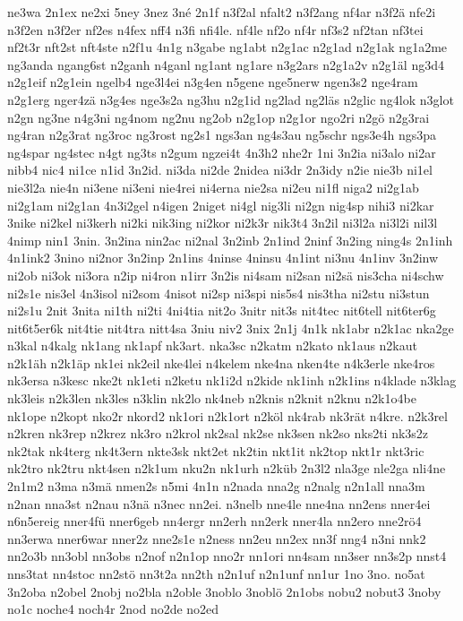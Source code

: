 {ne3wa
2n1ex
ne2xi
5ney
3nez
3né
2n1f
n3f2al
nfalt2
n3f2ang
nf4ar
n3f2ä
nfe2i
n3f2en
n3f2er
nf2es
n4fex
nff4
n3fi
nfi4le.
nf4le
nf2o
nf4r
nf3s2
nf2tan
nf3tei
nf2t3r
nft2st
nft4ste
n2f1u
4n1g
n3gabe
ng1abt
n2g1ac
n2g1ad
n2g1ak
ng1a2me
ng3anda
ngang6st
n2ganh
n4ganl
ng1ant
ng1are
n3g2ars
n2g1a2v
n2g1äl
ng3d4
n2g1eif
n2g1ein
ngelb4
nge3l4ei
n3g4en
n5gene
nge5nerw
ngen3s2
nge4ram
n2g1erg
nger4zä
n3g4es
nge3s2a
ng3hu
n2g1id
ng2lad
ng2läs
n2glic
ng4lok
n3glot
n2gn
ng3ne
n4g3ni
ng4nom
ng2nu
ng2ob
n2g1op
n2g1or
ngo2ri
n2gö
n2g3rai
ng4ran
n2g3rat
ng3roc
ng3rost
ng2s1
ngs3an
ng4s3au
ng5schr
ngs3e4h
ngs3pa
ng4spar
ng4stec
n4gt
ng3ts
n2gum
ngzei4t
4n3h2
nhe2r
1ni
3n2ia
ni3alo
ni2ar
nibb4
nic4
ni1ce
n1id
3n2id.
ni3da
ni2de
2nidea
ni3dr
2n3idy
n2ie
nie3b
ni1el
nie3l2a
nie4n
ni3ene
ni3eni
nie4rei
ni4erna
nie2sa
ni2eu
ni1fl
niga2
ni2g1ab
ni2g1am
ni2g1an
4n3i2gel
n4igen
2niget
ni4gl
nig3li
ni2gn
nig4sp
nihi3
ni2kar
3nike
ni2kel
ni3kerh
ni2ki
nik3ing
ni2kor
ni2k3r
nik3t4
3n2il
ni3l2a
ni3l2i
nil3l
4nimp
nin1
3nin.
3n2ina
nin2ac
ni2nal
3n2inb
2n1ind
2ninf
3n2ing
ning4s
2n1inh
4n1ink2
3nino
ni2nor
3n2inp
2n1ins
4ninse
4ninsu
4n1int
ni3nu
4n1inv
3n2inw
ni2ob
ni3ok
ni3ora
n2ip
ni4ron
n1irr
3n2is
ni4sam
ni2san
ni2sä
nis3cha
ni4schw
ni2s1e
nis3el
4n3isol
ni2som
4nisot
ni2sp
ni3spi
nis5s4
nis3tha
ni2stu
ni3stun
ni2s1u
2nit
3nita
ni1th
ni2ti
4ni4tia
nit2o
3nitr
nit3s
nit4tec
nit6tell
nit6ter6g
nit6t5er6k
nit4tie
nit4tra
nitt4sa
3niu
niv2
3nix
2n1j
4n1k
nk1abr
n2k1ac
nka2ge
n3kal
n4kalg
nk1ang
nk1apf
nk3art.
nka3sc
n2katm
n2kato
nk1aus
n2kaut
n2k1äh
n2k1äp
nk1ei
nk2eil
nke4lei
n4kelem
nke4na
nken4te
n4k3erle
nke4ros
nk3ersa
n3kesc
nke2t
nk1eti
n2ketu
nk1i2d
n2kide
nk1inh
n2k1ins
n4klade
n3klag
nk3leis
n2k3len
nk3les
n3klin
nk2lo
nk4neb
n2knis
n2knit
n2knu
n2k1o4be
nk1ope
n2kopt
nko2r
nkord2
nk1ori
n2k1ort
n2köl
nk4rab
nk3rät
n4kre.
n2k3rel
n2kren
nk3rep
n2krez
nk3ro
n2krol
nk2sal
nk2se
nk3sen
nk2so
nks2ti
nk3s2z
nk2tak
nk4terg
nk4t3ern
nkte3sk
nkt2et
nk2tin
nkt1it
nk2top
nkt1r
nkt3ric
nk2tro
nk2tru
nkt4sen
n2k1um
nku2n
nk1urh
n2küb
2n3l2
nla3ge
nle2ga
nli4ne
2n1m2
n3ma
n3mä
nmen2s
n5mi
4n1n
n2nada
nna2g
n2nalg
n2n1all
nna3m
n2nan
nna3st
n2nau
n3nä
n3nec
nn2ei.
n3nelb
nne4le
nne4na
nn2ens
nner4ei
n6n5ereig
nner4fü
nner6geb
nn4ergr
nn2erh
nn2erk
nner4la
nn2ero
nne2rö4
nn3erwa
nner6war
nner2z
nne2s1e
n2ness
nn2eu
nn2ex
nn3f
nng4
n3ni
nnk2
nn2o3b
nn3obl
nn3obs
n2nof
n2n1op
nno2r
nn1ori
nn4sam
nn3ser
nn3s2p
nnst4
nns3tat
nn4stoc
nn2stö
nn3t2a
nn2th
n2n1uf
n2n1unf
nn1ur
1no
3no.
no5at
3n2oba
n2obel
2nobj
no2bla
n2oble
3noblo
3noblö
2n1obs
nobu2
nobut3
3noby
no1c
noche4
noch4r
2nod
no2de
no2ed
}
